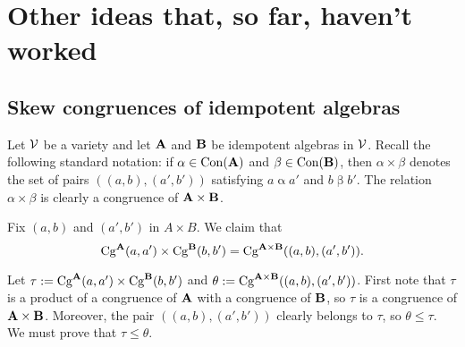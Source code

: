 


\appendix

\section{Other ideas that, so far, haven't worked}

\subsection{Skew congruences of idempotent algebras}
Let $\mathcal{V}$ be a variety and let $\mathbf{A}$ and $\mathbf{B}$ be idempotent
algebras in $\mathcal{V}$.
Recall the following standard notation:
if $\alpha \in \operatorname{Con}(\mathbf{A})$ and $\beta \in \operatorname{Con}(\mathbf{B})$, then
$\alpha \times \beta$ denotes the set of pairs $((a,b),(a',b'))$ satisfying
$a \mathrel{\alpha} a'$ and $b \mathrel{\beta} b'$.  The relation 
$\alpha \times \beta$ is clearly a congruence of $\mathbf{A} \times \mathbf{B}$.

Fix $(a, b)$ and $(a', b')$ in $A \times B$.
We claim that
\[\operatorname{Cg}^{\mathbf{A}}(a,a') \times \operatorname{Cg}^{\mathbf{B}}(b,b')
=\operatorname{Cg}^{\mathbf{A} \times \mathbf{B}}((a, b), (a', b')).\]

Let $\tau := \operatorname{Cg}^{\mathbf{A}}(a,a') \times \operatorname{Cg}^{\mathbf{B}}(b,b')$  %
and $\theta:= \operatorname{Cg}^{\mathbf{A} \times \mathbf{B}}((a, b), (a', b'))$.
First note that $\tau$ is a product of a congruence
of $\mathbf{A}$ with a congruence of $\mathbf{B}$, so $\tau$
is a congruence of $\mathbf{A}\times \mathbf{B}$.
Moreover, the pair $((a,b), (a',b'))$ clearly belongs to $\tau$, so
$\theta\leq \tau$.  We must prove that $\tau \leq \theta$.

